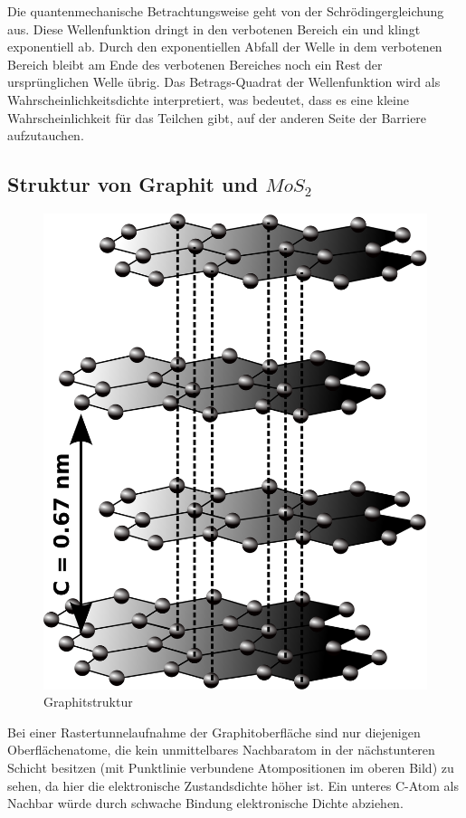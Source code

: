 \documentclass[12pt]{article}
\begin{document}
Die quantenmechanische Betrachtungsweise geht von der Schrödingergleichung aus. Diese Wellenfunktion dringt in den verbotenen Bereich ein und klingt exponentiell ab. Durch den exponentiellen Abfall der Welle in dem verbotenen Bereich bleibt am Ende des verbotenen Bereiches noch ein Rest der ursprünglichen Welle übrig. Das Betrags-Quadrat der Wellenfunktion  wird als Wahrscheinlichkeitsdichte interpretiert, was bedeutet, dass es eine kleine Wahrscheinlichkeit für das Teilchen gibt, auf der anderen Seite der Barriere aufzutauchen.


\subsection{Struktur von Graphit und $MoS_2$}
\begin{figure}[H]
\centering
\includegraphics[width=0.6\linewidth]{pictures/graphitgitter.eps}
\caption{Graphitstruktur}
\end{figure}
Bei einer Rastertunnelaufnahme der Graphitoberfläche sind nur diejenigen Oberflächenatome, die kein unmittelbares Nachbaratom in der nächstunteren Schicht besitzen (mit Punktlinie verbundene Atompositionen im oberen Bild) zu sehen, da hier die elektronische Zustandsdichte höher ist. Ein unteres C-Atom als Nachbar würde durch schwache Bindung elektronische Dichte abziehen.
\end{document}
